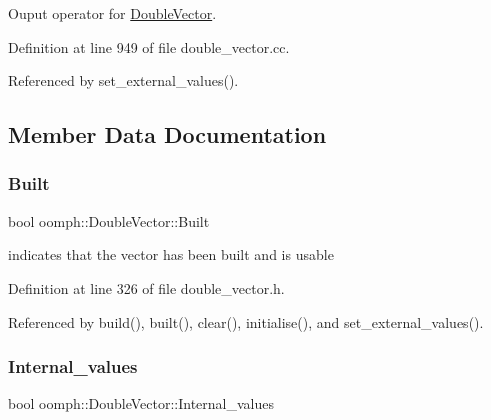Ouput operator for \hyperlink{classoomph_1_1DoubleVector}{Double\+Vector}. 



Definition at line 949 of file double\+\_\+vector.\+cc.



Referenced by set\+\_\+external\+\_\+values().



\subsection{Member Data Documentation}
\mbox{\label{classoomph_1_1DoubleVector_ab72c78c801b28fdd00391a9c266413ea}} 
\subsubsection{\texorpdfstring{Built}{Built}}
{\footnotesize\ttfamily bool oomph\+::\+Double\+Vector\+::\+Built\hspace{0.3cm}{\ttfamily [private]}}



indicates that the vector has been built and is usable 



Definition at line 326 of file double\+\_\+vector.\+h.



Referenced by build(), built(), clear(), initialise(), and set\+\_\+external\+\_\+values().

\mbox{\label{classoomph_1_1DoubleVector_a9b205077360d67c9de07e538199f335f}} 
\subsubsection{\texorpdfstring{Internal\+\_\+values}{Internal\_values}}
{\footnotesize\ttfamily bool oomph\+::\+Double\+Vector\+::\+Internal\+\_\+values\hspace{0.3cm}{\ttfamily [private]}}



